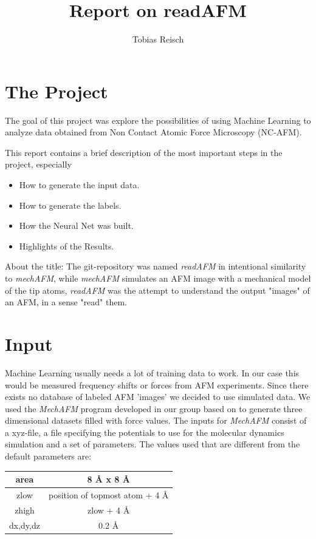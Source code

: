 \documentclass{article}
\begin{document}
\author{Tobias Reisch}
\title{Report on readAFM}
\maketitle

\section{The Project}

The goal of this project was explore the possibilities of using Machine Learning to analyze data obtained from Non Contact Atomic Force Microscopy (NC-AFM).

This report contains a brief description of the most important steps in the project, especially
\begin{itemize}
\item How to generate the input data.
\item How to generate the labels.
\item How the Neural Net was built.
\item Highlights of the Results.
\end{itemize}

About the title: The git-repository was named \emph{readAFM} in intentional similarity to \emph{mechAFM}, while \emph{mechAFM} simulates an AFM image with a mechanical model of the tip atoms, \emph{readAFM} was the attempt to understand the output "images" of an AFM, in a sense "read" them.


\newpage
\section{Input}

Machine Learning usually needs a lot of training data to work. In our case this would be measured frequency shifts or forces from AFM experiments. Since there exists no database of labeled AFM 'images' we decided to use simulated data. We used the \emph{MechAFM} program developed in our group based on \cite{hapala2014, hamalainen2014} to generate three dimensional datasets filled with force values. The inputs for \emph{MechAFM} consist of a xyz-file, a file specifying the potentials to use for the molecular dynamics simulation and a set of parameters. The values used that are different from the default parameters are:

\begin{center}
\begin{tabular}{|c|c|}
\hline area & 8 {\AA} x 8 {\AA} \\ 
\hline zlow & position of topmost atom + 4 {\AA} \\ 
\hline zhigh & zlow + 4 {\AA} \\ 
\hline dx,dy,dz & 0.2 {\AA} \\ 
\hline 

\end{tabular} 
\end{center}
\end{document}
